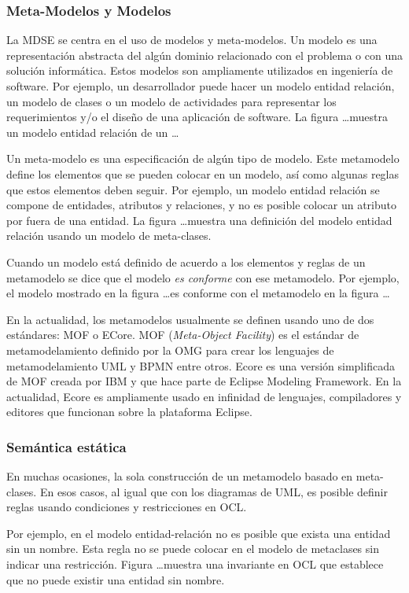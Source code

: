 \subsubsection{Meta-Modelos y Modelos}

La MDSE se centra en el uso de modelos y meta-modelos.
Un modelo es una representación abstracta del algún dominio relacionado con el problema o con una solución informática.
Estos modelos son ampliamente utilizados en ingeniería de software.
Por ejemplo, un desarrollador puede hacer un modelo entidad relación, un modelo de clases o un modelo de actividades para representar los requerimientos y/o el diseño de una aplicación de software.
La figura \ldots muestra un modelo entidad relación de un \ldots  

Un meta-modelo es una especificación de algún tipo de modelo. 
Este metamodelo define los elementos que se pueden colocar en un modelo, así como algunas reglas que estos elementos deben seguir.
Por ejemplo, un modelo entidad relación se compone de entidades, atributos y relaciones, y no es posible colocar un atributo por fuera de una entidad.
La figura \ldots muestra una definición del modelo entidad relación usando un modelo de meta-clases.

Cuando un modelo está definido de acuerdo a los elementos y reglas de un metamodelo se dice que el modelo \textit{es conforme} con ese metamodelo.
Por ejemplo, el modelo mostrado en la figura \ldots es conforme con el metamodelo en la figura \ldots 

En la actualidad, los metamodelos usualmente se definen usando uno de dos estándares: MOF o ECore.
MOF (\textit{Meta-Object Facility}) es el estándar de metamodelamiento definido por la OMG para crear los lenguajes de metamodelamiento UML y BPMN entre otros.
Ecore es una versión simplificada de MOF creada por IBM y que hace parte de Eclipse Modeling Framework.
En la actualidad, Ecore es ampliamente usado en infinidad de lenguajes, compiladores y editores que funcionan sobre la plataforma Eclipse. 

\subsubsection{Semántica estática}

En muchas ocasiones, la sola construcción de un metamodelo basado en meta-clases.
En esos casos, al igual que con los diagramas de UML, es posible definir reglas usando condiciones y restricciones en OCL.

Por ejemplo, en el modelo entidad-relación no es posible que exista una entidad sin un nombre.
Esta regla no se puede colocar en el modelo de metaclases sin indicar una restricción.
Figura \ldots muestra una invariante en OCL que establece que no puede existir una entidad sin nombre.

